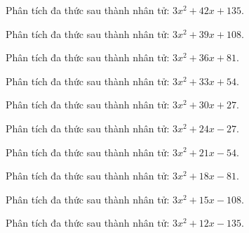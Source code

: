 \begin{bt}
	Phân tích đa thức sau thành nhân tử: $3 x^2 + 42 x + 135$.
\end{bt}
\begin{bt}
	Phân tích đa thức sau thành nhân tử: $3 x^2 + 39 x + 108$.
\end{bt}
\begin{bt}
	Phân tích đa thức sau thành nhân tử: $3 x^2 + 36 x + 81$.
\end{bt}
\begin{bt}
	Phân tích đa thức sau thành nhân tử: $3 x^2 + 33 x + 54$.
\end{bt}
\begin{bt}
	Phân tích đa thức sau thành nhân tử: $3 x^2 + 30 x + 27$.
\end{bt}
\begin{bt}
	Phân tích đa thức sau thành nhân tử: $3 x^2 + 24 x - 27$.
\end{bt}
\begin{bt}
	Phân tích đa thức sau thành nhân tử: $3 x^2 + 21 x - 54$.
\end{bt}
\begin{bt}
	Phân tích đa thức sau thành nhân tử: $3 x^2 + 18 x - 81$.
\end{bt}
\begin{bt}
	Phân tích đa thức sau thành nhân tử: $3 x^2 + 15 x - 108$.
\end{bt}
\begin{bt}
	Phân tích đa thức sau thành nhân tử: $3 x^2 + 12 x - 135$.
\end{bt}
